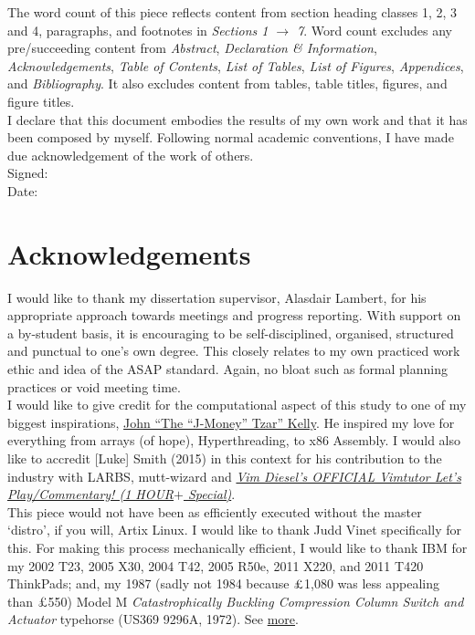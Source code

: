 \documentclass[11pt, english]{article}
\begin{document}
	The word count of this piece reflects content from section heading classes 1, 2, 3 and 4, paragraphs, and footnotes in \textit{Sections 1 $\rightarrow$ 7}. Word count excludes any pre/succeeding content from \textit{Abstract}, \textit{Declaration \& Information}, \textit{Acknowledgements}, \textit{Table of Contents}, \textit{List of Tables}, \textit{List of Figures}, \textit{Appendices}, and \textit{Bibliography}. It also excludes content from tables, table titles, figures, and figure titles.\\

	I declare that this document embodies the results of my own work and that it has been composed by myself. Following normal academic conventions, I have made due acknowledgement of the work of others.\\

	Signed:\\ 

	Date:

\newpage

	\section*{Acknowledgements}

	I would like to thank my dissertation supervisor, Alasdair Lambert, for his appropriate approach towards meetings and progress reporting. With support on a by-student basis, it is encouraging to be self-disciplined, organised, structured and punctual to one's own degree. This closely relates to my own practiced work ethic and idea of the ASAP standard. Again, no bloat such as formal planning practices or void meeting time.\\

	I would like to give credit for the computational aspect of this study to one of my biggest inspirations, \href{http://lewisbritton.com/Blog/Founding-Fathers.html}{John ``The ``J-Money'' Tzar'' Kelly}. He inspired my love for everything from arrays (of hope), Hyperthreading, to x86 Assembly. I would also like to accredit [Luke] Smith (2015) in this context for his contribution to the industry with LARBS, mutt-wizard and \href{https://m.youtube.com/watch?v=d8XtNXutVto}{\textit{Vim Diesel's OFFICIAL Vimtutor Let's Play/Commentary! (1 HOUR$+$ Special)}}.\\

	This piece would not have been as efficiently executed without the master `distro’, if you will, Artix Linux. I would like to thank Judd Vinet specifically for this. For making this process mechanically efficient, I would like to thank IBM for my 2002 T23, 2005 X30, 2004 T42, 2005 R50e, 2011 X220, and 2011 T420 ThinkPads; and, my 1987 (sadly not 1984 because $\textrm{\pounds}$1,080 was less appealing than $\textrm{\pounds}$550) Model M \textit{Catastrophically Buckling Compression Column Switch and Actuator} typehorse (US369 9296A, 1972). See \href{http://lewisbritton.com/Blog/ThinkFlow.html}{more}. 
\end{document}
